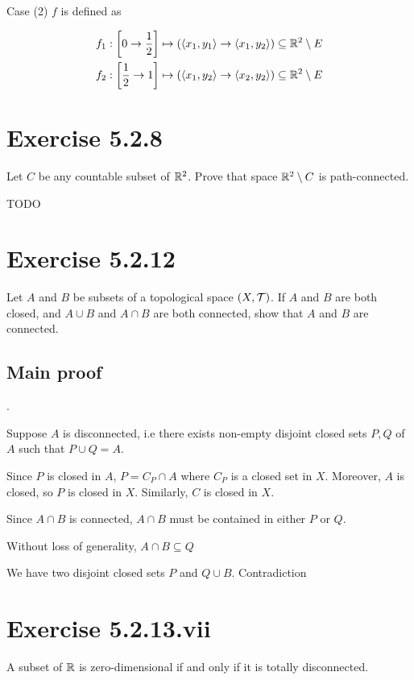 \documentclass{article}
\begin{document}
Case (2)
$f$ is defined as

\begin{align*}
    f_1: \left[ 0 \to \frac{1}{2} \right] &\mapsto (\langle x_1, y_1\rangle \to \langle x_1, y_2\rangle) \subseteq \mathbb{R}^2 \setminus E \\
    f_2: \left[\frac{1}{2} \to 1 \right] &\mapsto (\langle x_1, y_2\rangle \to \langle x_2, y_2\rangle) \subseteq \mathbb{R}^2 \setminus E \\
\end{align*}


\section*{Exercise 5.2.8}

Let $C$ be any countable subset of $\mathbb{R}^2$. Prove that space $\mathbb{R}^2 \setminus C$ is path-connected.

TODO

\section*{Exercise 5.2.12}

Let $A$ and $B$ be subsets of a topological space $(X, \mathcal{T})$. If $A$ and $B$ are both
closed, and $A \cup B$ and $A \cap B$ are both connected, show that $A$ and $B$ are connected.

\subsection*{Main proof} .

Suppose $A$ is disconnected, i.e there exists non-empty disjoint closed sets $P, Q$ of $A$ such that $P \cup Q = A$.

Since $P$ is closed in $A$, $P = C_P \cap A$ where $C_P$ is a closed set in $X$. Moreover, $A$ is closed, so $P$ is closed in $X$. Similarly, $C$ is closed in $X$.

Since $A \cap B$ is connected, $A \cap B$ must be contained in either $P$ or $Q$.

Without loss of generality, $A \cap B \subseteq Q$

We have two disjoint closed sets $P$ and $Q \cup B$. Contradiction

\section*{Exercise 5.2.13.vii}

A subset of $\mathbb{R}$ is zero-dimensional if and only if it is totally disconnected.
\end{document}
